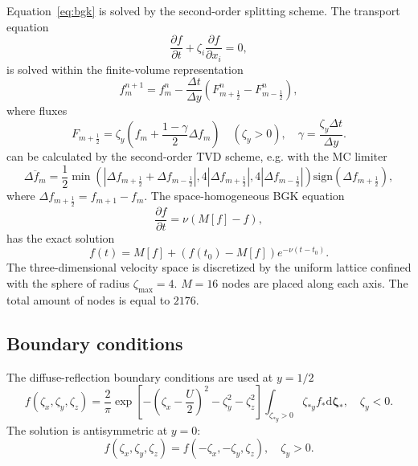 \documentclass{article}
\theoremstyle{plain}
\newcommand{\dd}{\mathrm{d}}
\newcommand{\pder}[2][]{\frac{\partial#1}{\partial#2}}
\newcommand{\dzeta}{\boldsymbol{\dd\zeta}}
\begin{document}
Equation~\eqref{eq:bgk} is solved by the second-order splitting scheme.
The transport equation
\begin{equation}\label{eq:split_transport}
    \pder[f]{t} + \zeta_i\pder[f]{x_i} = 0,
\end{equation}
is solved within the finite-volume representation
\begin{equation}\label{eq:finite_volume}
    f^{n+1}_m = f^n_m - \frac{\Delta{t}}{\Delta{y}}\left(F^n_{m+\frac12}-F^n_{m-\frac12}\right),
\end{equation}
where fluxes
\begin{equation}\label{eq:fluxes}
    F_{m+\frac12} = \zeta_y\left( f_m + \frac{1-\gamma}2\Delta{f_m}\right) \quad(\zeta_y>0),
    \quad \gamma = \frac{\zeta_y\Delta{t}}{\Delta{y}}.
\end{equation}
can be calculated by the second-order TVD scheme, e.g. with the MC limiter
\begin{equation}\label{eq:MC_limiter}
    \overline{\Delta{f_m}} = \frac12\min\left(
        |\Delta f_{m+\frac12} + \Delta f_{m-\frac12}|, 4|\Delta f_{m+\frac12}|, 4|\Delta f_{m-\frac12}|
    \right)\mathrm{sign}(\Delta f_{m+\frac12}),
\end{equation}
where \(\Delta f_{m+\frac12} = f_{m+1} - f_m\).
The space-homogeneous BGK equation
\begin{equation}\label{eq:homogeneous}
    \pder[f]{t} = \nu (M[f]-f),
\end{equation}
has the exact solution
\begin{equation}\label{eq:exact_bgk}
    f(t) = M[f] + (f(t_0)-M[f])e^{-\nu (t-t_0)}.
\end{equation}
The three-dimensional velocity space is discretized by the uniform lattice confined with the sphere of radius \(\zeta_{\max}=4\).
\(M=16\) nodes are placed along each axis. The total amount of nodes is equal to \(2176\).

\subsection{Boundary conditions}

The diffuse-reflection boundary conditions are used at \(y=1/2\)
\begin{equation}\label{eq:diffuse}
    f(\zeta_x,\zeta_y,\zeta_z) = \frac2{\pi} \exp\left[-\left(\zeta_x-\frac{U}{2}\right)^2-\zeta_y^2-\zeta_z^2\right]
        \int_{\zeta_{*y}>0}\zeta_{*y} f_* \dzeta_*, \quad \zeta_y<0.
\end{equation}
The solution is antisymmetric at \(y=0\):
\begin{equation}\label{eq:antisymmetry}
    f(\zeta_x,\zeta_y,\zeta_z) = f(-\zeta_x,-\zeta_y,\zeta_z), \quad \zeta_y>0.
\end{equation}

\printbibliography
\end{document}
